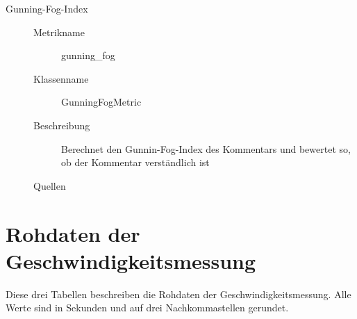 \begin{appendices}
\begin{description}
\item[Gunning-Fog-Index]
\begin{description}
\item[]
    \item [Metrikname]  gunning\_fog
    \item [Klassenname] GunningFogMetric
    \item[Beschreibung] Berechnet den Gunnin-Fog-Index des Kommentars und bewertet so, ob der Kommentar verständlich ist
     \item[Quellen] \cite[S. 71]{AutomaticQualityAssessmentofSourceCodeComments:TheJavadocMiner}
\end{description}
 \end{description}



\chapter{Rohdaten der Geschwindigkeitsmessung}\label{chapter:raw_speed_data}
Diese drei Tabellen beschreiben die Rohdaten der Geschwindigkeitsmessung. Alle Werte sind in Sekunden und auf drei Nachkommastellen gerundet. 
\begin{table}[ht!]
    \centering
  \hspace{0.5cm}
\end{table}
\end{appendices}
